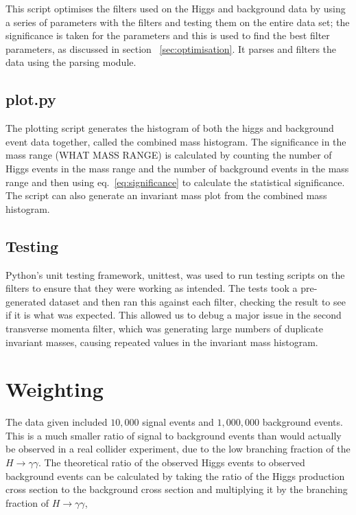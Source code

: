 \documentclass[11pt]{amsart}
\begin{document}
\begin{multicols}{2}
This script optimises the filters used on the Higgs and background data by using a series of parameters with the filters and testing them on the entire data set; the significance is taken for the parameters and this is used to find the best filter parameters, as discussed in section ~\ref{sec:optimisation}. It parses and filters the data using the parsing module.

\subsection{plot.py}

The plotting script generates the histogram of both the higgs and background event data together, called the combined mass histogram. The significance in the mass range (WHAT MASS RANGE) is calculated by counting the number of Higgs events in the mass range and the number of background events in the mass range and then using eq.~\ref{eq:significance} to calculate the statistical significance. The script can also generate an invariant mass plot from the combined mass histogram.

\subsection{Testing}
\label{sec:testing}

Python's unit testing framework, unittest, was used to run testing scripts on the filters to ensure that they were working as intended. The tests took a pre-generated dataset and then ran this against each filter, checking the result to see if it is what was expected. This allowed us to debug a major issue in the second transverse momenta filter, which was generating large numbers of duplicate invariant masses, causing repeated values in the invariant mass histogram.

\section{Weighting}

The data given included $10,000$ signal events and $1,000,000$ background events. This is a much smaller ratio of signal to background events than would actually be observed in a real collider experiment, due to the low branching fraction of the $H \to \gamma\gamma$. The theoretical ratio of the observed Higgs events to observed background events can be calculated by taking the ratio of the Higgs production cross section to the background cross section and multiplying it by the branching fraction of $H \to \gamma\gamma$,


\end{multicols}
\end{document}

